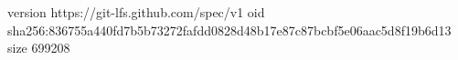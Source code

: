 version https://git-lfs.github.com/spec/v1
oid sha256:836755a440fd7b5b73272fafdd0828d48b17e87c87bcbf5e06aac5d8f19b6d13
size 699208
